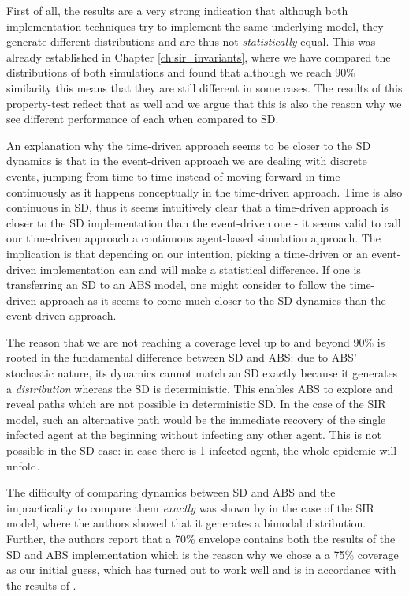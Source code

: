 First of all, the results are a very strong indication that although both implementation techniques try to implement the same underlying model, they generate different distributions and are thus not \textit{statistically} equal. This was already established in Chapter \ref{ch:sir_invariants}, where we have compared the distributions of both simulations and found that although we reach 90\% similarity this means that they are still different in some cases. The results of this property-test reflect that as well and we argue that this is also the reason why we see different performance of each when compared to SD. 

An explanation why the time-driven approach seems to be closer to the SD dynamics is that in the event-driven approach we are dealing with discrete events, jumping from time to time instead of moving forward in time continuously as it happens conceptually in the time-driven approach. Time is also continuous in SD, thus it seems intuitively clear that a time-driven approach is closer to the SD implementation than the event-driven one - it seems valid to call our time-driven approach a continuous agent-based simulation approach. The implication is that depending on our intention, picking a time-driven or an event-driven implementation can and will make a statistical difference. If one is transferring an SD to an ABS model, one might consider to follow the time-driven approach as it seems to come much closer to the SD dynamics than the event-driven approach.

\medskip

The reason that we are not reaching a coverage level up to and beyond 90\% is rooted in the fundamental difference between SD and ABS: due to ABS' stochastic nature, its dynamics cannot match an SD exactly because it generates a \textit{distribution} whereas the SD is deterministic. This enables ABS to explore and reveal paths which are not possible in deterministic SD. In the case of the SIR model, such an alternative path would be the immediate recovery of the single infected agent at the beginning without infecting any other agent. This is not possible in the SD case: in case there is 1 infected agent, the whole epidemic will unfold.

The difficulty of comparing dynamics between SD and ABS and the impracticality to compare them \textit{exactly} was shown by \cite{macal_agent-based_2010} in the case of the SIR model, where the authors showed that it generates a bimodal distribution. Further, the authors report that a 70\% envelope contains both the results of the SD and ABS implementation which is the reason why we chose a a 75\% coverage as our initial guess, which has turned out to work well and is in accordance with the results of \cite{macal_agent-based_2010}. %

